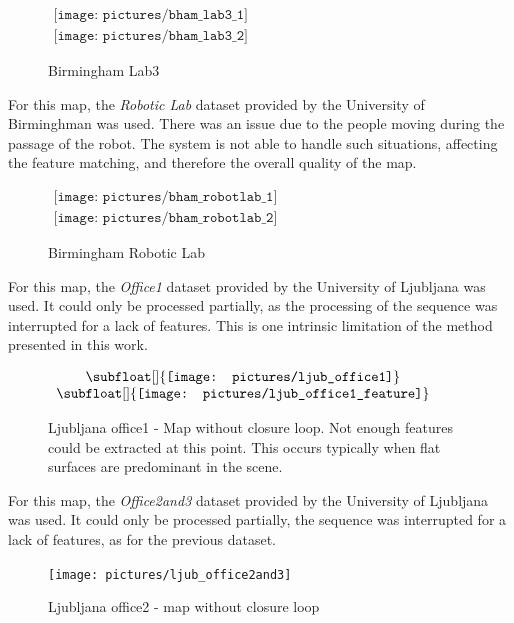 \begin{figure}[H]
\centering$
 \begin{array}{c}
 \texttt{[image: pictures/bham\_lab3\_1]} \\
 \texttt{[image: pictures/bham\_lab3\_2]}
 \end{array}$
\caption{Birmingham Lab3}
\end{figure}

\clearpage
For this map, the \emph{Robotic Lab} dataset provided by the University of Birminghman was used. There was an issue due to the people moving during the passage of the robot. The system is not able to handle such situations, affecting the feature matching, and therefore the overall quality of the map.

\begin{figure}[H]
\centering$
\begin{array}{c}
\texttt{[image: pictures/bham\_robotlab\_1]} \\
\texttt{[image: pictures/bham\_robotlab\_2]}
\end{array}$
\caption{Birmingham Robotic Lab}
\end{figure}

\clearpage
For this map, the \emph{Office1} dataset provided by the University of Ljubljana was used. It could only be processed partially, as the processing of the sequence was interrupted for a lack of features. This is one intrinsic limitation of the method presented in this work.

\begin{figure}[H]
\centering$
 \begin{array}{c}
 \subfloat[]{\label{fig:ljub1_1} \texttt{[image: pictures/ljub\_office1]}} \\
 \subfloat[]{\label{fig:ljub1_2} \texttt{[image: pictures/ljub\_office1\_feature]}}
 \end{array}$
\caption{Ljubljana office1 - \protect{} Map without closure loop. \protect{} Not enough features could be extracted at this point. This occurs typically when flat surfaces are predominant in the scene. }
\end{figure}

\clearpage
For this map, the \emph{Office2and3} dataset provided by the University of Ljubljana was used. It could only be processed partially, the sequence was interrupted for a lack of features, as for the previous dataset.

\begin{figure}[H]
\centering
\texttt{[image: pictures/ljub\_office2and3]}
\caption{Ljubljana office2 - map without closure loop}
\end{figure}

